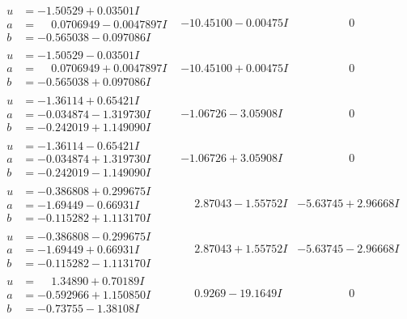 \documentclass[1p]{elsarticle_modified}
\theoremstyle{definition}
\begin{document}
$$\begin{array}{c|c|c}
 \hline 
\begin{aligned}
u &= -1.50529 + 0.03501 I \\
a &= \phantom{-}0.0706949 - 0.0047897 I \\
b &= -0.565038 - 0.097086 I\end{aligned}
 & -10.45100 - 0.00475 I & \phantom{-0.000000 } 0 \\ \hline\begin{aligned}
u &= -1.50529 - 0.03501 I \\
a &= \phantom{-}0.0706949 + 0.0047897 I \\
b &= -0.565038 + 0.097086 I\end{aligned}
 & -10.45100 + 0.00475 I & \phantom{-0.000000 } 0 \\ \hline\begin{aligned}
u &= -1.36114 + 0.65421 I \\
a &= -0.034874 - 1.319730 I \\
b &= -0.242019 + 1.149090 I\end{aligned}
 & -1.06726 - 3.05908 I & \phantom{-0.000000 } 0 \\ \hline\begin{aligned}
u &= -1.36114 - 0.65421 I \\
a &= -0.034874 + 1.319730 I \\
b &= -0.242019 - 1.149090 I\end{aligned}
 & -1.06726 + 3.05908 I & \phantom{-0.000000 } 0 \\ \hline\begin{aligned}
u &= -0.386808 + 0.299675 I \\
a &= -1.69449 - 0.66931 I \\
b &= -0.115282 + 1.113170 I\end{aligned}
 & \phantom{-}2.87043 - 1.55752 I & -5.63745 + 2.96668 I \\ \hline\begin{aligned}
u &= -0.386808 - 0.299675 I \\
a &= -1.69449 + 0.66931 I \\
b &= -0.115282 - 1.113170 I\end{aligned}
 & \phantom{-}2.87043 + 1.55752 I & -5.63745 - 2.96668 I \\ \hline\begin{aligned}
u &= \phantom{-}1.34890 + 0.70189 I \\
a &= -0.592966 + 1.150850 I \\
b &= -0.73755 - 1.38108 I\end{aligned}
 & \phantom{-}0.9269 - 19.1649 I & \phantom{-0.000000 } 0 \\ \hline\begin{aligned}

\end{aligned}
\end{array}$$
\end{document}
